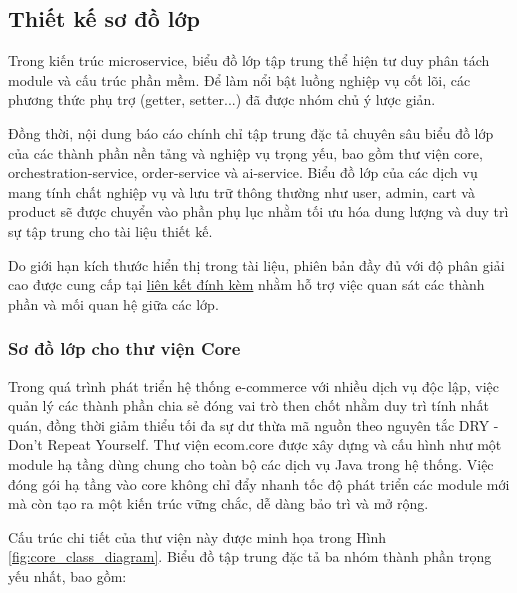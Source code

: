 \subsection{Thiết kế sơ đồ lớp} \label{sec:class_diagram}

Trong kiến trúc microservice, biểu đồ lớp tập trung thể hiện tư duy phân tách module và cấu trúc phần mềm. Để làm nổi bật luồng nghiệp vụ cốt lõi, các phương thức phụ trợ (getter, setter...) đã được nhóm chủ ý lược giản.

Đồng thời, nội dung báo cáo chính chỉ tập trung đặc tả chuyên sâu biểu đồ lớp của các thành phần nền tảng và nghiệp vụ trọng yếu, bao gồm thư viện core, orchestration-service, order-service và ai-service. Biểu đồ lớp của các dịch vụ mang tính chất nghiệp vụ và lưu trữ thông thường như user, admin, cart và product sẽ được chuyển vào phần phụ lục nhằm tối ưu hóa dung lượng và duy trì sự tập trung cho tài liệu thiết kế.

Do giới hạn kích thước hiển thị trong tài liệu, phiên bản đầy đủ với độ phân giải cao được cung cấp tại \href{https://drive.google.com/drive/folders/1bg3YoloCTyKwa6vXfV9YgwM5WIQV_Zcn?usp=sharing}{liên kết đính kèm} nhằm hỗ trợ việc quan sát các thành phần và mối quan hệ giữa các lớp.

\subsubsection{Sơ đồ lớp cho thư viện Core} \label{subsec:core_class_diagram}
Trong quá trình phát triển hệ thống e-commerce với nhiều dịch vụ độc lập, việc quản lý các thành phần chia sẻ đóng vai trò then chốt nhằm duy trì tính nhất quán, đồng thời giảm thiểu tối đa sự dư thừa mã nguồn theo nguyên tắc DRY - Don't Repeat Yourself. Thư viện ecom.core được xây dựng và cấu hình như một module hạ tầng dùng chung cho toàn bộ các dịch vụ Java trong hệ thống. Việc đóng gói hạ tầng vào core không chỉ đẩy nhanh tốc độ phát triển các module mới mà còn tạo ra một kiến trúc vững chắc, dễ dàng bảo trì và mở rộng.

Cấu trúc chi tiết của thư viện này được minh họa trong Hình \ref{fig:core_class_diagram}. Biểu đồ tập trung đặc tả ba nhóm thành phần trọng yếu nhất, bao gồm:

